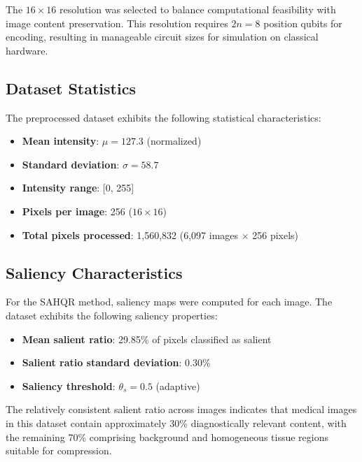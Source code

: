\documentclass{ipol}
\begin{document}
The $16 \times 16$ resolution was selected to balance computational feasibility with image content preservation. This resolution requires $2n = 8$ position qubits for encoding, resulting in manageable circuit sizes for simulation on classical hardware.

\subsection{Dataset Statistics}

The preprocessed dataset exhibits the following statistical characteristics:

\begin{itemize}
\item \textbf{Mean intensity}: $\mu = 127.3$ (normalized)
\item \textbf{Standard deviation}: $\sigma = 58.7$
\item \textbf{Intensity range}: [0, 255]
\item \textbf{Pixels per image}: 256 ($16 \times 16$)
\item \textbf{Total pixels processed}: 1,560,832 (6,097 images $\times$ 256 pixels)
\end{itemize}

\subsection{Saliency Characteristics}

For the SAHQR method, saliency maps were computed for each image. The dataset exhibits the following saliency properties:

\begin{itemize}
\item \textbf{Mean salient ratio}: 29.85\% of pixels classified as salient
\item \textbf{Salient ratio standard deviation}: 0.30\%
\item \textbf{Saliency threshold}: $\theta_s = 0.5$ (adaptive)
\end{itemize}

The relatively consistent salient ratio across images indicates that medical images in this dataset contain approximately 30\% diagnostically relevant content, with the remaining 70\% comprising background and homogeneous tissue regions suitable for compression.

\end{document}
